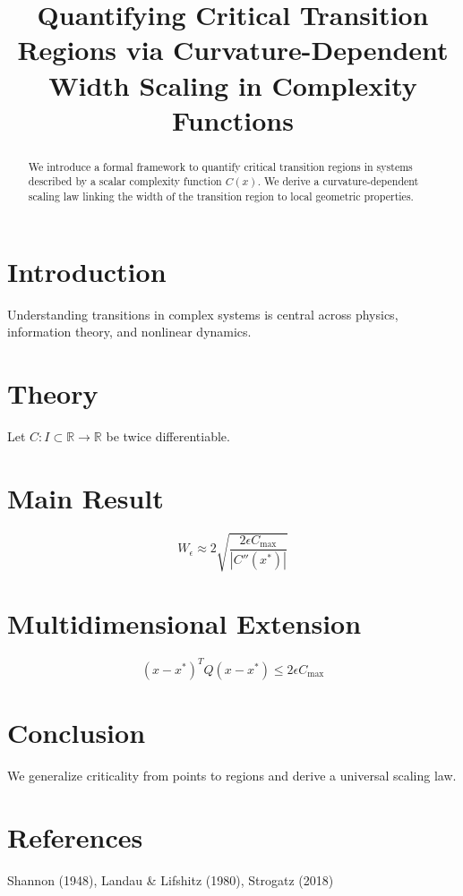 \documentclass[twocolumn]{article}
\title{\textbf{Quantifying Critical Transition Regions via Curvature-Dependent Width Scaling in Complexity Functions}}
\author{}
\date{}
\begin{document}
\maketitle

\begin{abstract}
We introduce a formal framework to quantify critical transition regions in systems described by a scalar complexity function $C(x)$. We derive a curvature-dependent scaling law linking the width of the transition region to local geometric properties.
\end{abstract}

\section{Introduction}
Understanding transitions in complex systems is central across physics, information theory, and nonlinear dynamics.

\section{Theory}
Let $C: I \subset \mathbb{R} \to \mathbb{R}$ be twice differentiable.

\section{Main Result}
\begin{equation}
W_\epsilon \approx 2\sqrt{\frac{2\epsilon C_{\max}}{|C''(x^*)|}}
\end{equation}

\section{Multidimensional Extension}
\begin{equation}
(x-x^*)^T Q (x-x^*) \le 2\epsilon C_{\max}
\end{equation}

\section{Conclusion}
We generalize criticality from points to regions and derive a universal scaling law.

\section{References}
Shannon (1948), Landau \& Lifshitz (1980), Strogatz (2018)
\end{document}
